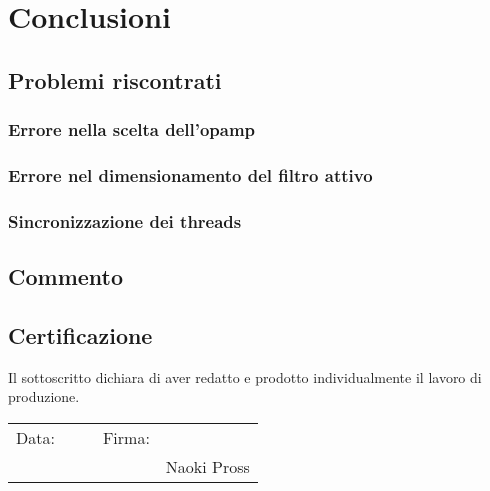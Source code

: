 \chapter{Conclusioni}
\section{Problemi riscontrati}


\subsection{Errore nella scelta dell'opamp} \label{sec:err-opamp}
\subsection{Errore nel dimensionamento del filtro attivo}
\subsection{Sincronizzazione dei threads}


\section{Commento}
\section{Certificazione}
Il sottoscritto dichiara di aver redatto e prodotto individualmente il lavoro
di produzione.
\begin{flushright}
\begin{tabular}{ r p{5cm} p{1cm} r p{5cm}}
    Data: & \hrulefill && Firma: & \hrulefill \\
    &&&& Naoki Pross \\
\end{tabular}
\end{flushright}
